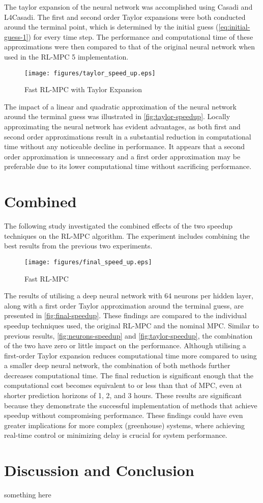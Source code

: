 The taylor expansion of the neural network was accomplished using Casadi and L4Casadi. The first and second order Taylor expansions were both conducted around the terminal point, which is determined by the initial guess (\autoref{eq:initial-guess-1}) for every time step. The performance and computational time of these approximations were then compared to that of the original neural network when used in the RL-MPC 5 implementation.


\begin{figure}[H]
	\centering
	\texttt{[image: figures/taylor\_speed\_up.eps]}
	\caption{Fast RL-MPC with Taylor Expansion}
	\label{fig:taylor-speedup}
\end{figure}

The impact of a linear and quadratic approximation of the neural network around the terminal guess was illustrated in \autoref{fig:taylor-speedup}. Locally approximating the neural network has evident advantages, as both first and second order approximations result in a substantial reduction in computational time without any noticeable decline in performance. It appears that a second order approximation is unnecessary and a first order approximation may be preferable due to its lower computational time without sacrificing performance.


\section{Combined}
The following study investigated the combined effects of the two speedup techniques on the RL-MPC algorithm. The experiment includes combining the best results from the previous two experiments.


\begin{figure}[H]
	\centering
	\texttt{[image: figures/final\_speed\_up.eps]}
	\caption{Fast RL-MPC}
	\label{fig:final-speedup}
\end{figure}


The results of utilising a deep neural network with 64 neurons per hidden layer, along with a first order Taylor approximation around the terminal guess, are presented in \autoref{fig:final-speedup}. These findings are compared to the individual speedup techniques used, the original RL-MPC and the nominal MPC. Similar to previous results, \autoref{fig:neurons-speedup} and \autoref{fig:taylor-speedup}, the combination of the two have zero or little impact on the performance. Although utilising a first-order Taylor expansion reduces computational time more compared to using a smaller deep neural network, the combination of both methods further decreases computational time. The final  reduction is significant enough that the computational cost becomes equivalent to or less than that of MPC, even at shorter prediction horizons of 1, 2, and 3 hours. These results are significant because they demonstrate the successful implementation of methods that achieve speedup without compromising performance. These findings could have even greater implications for more complex (greenhouse) systems, where achieving real-time control or minimizing delay is crucial for system performance.



\section{Discussion and Conclusion}

something here